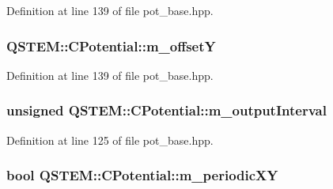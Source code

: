 Definition at line 139 of file pot\-\_\-base.\-hpp.

\hypertarget{class_q_s_t_e_m_1_1_c_potential_accee84f1b62c4d86ff92cea388737b4d}{
\subsubsection[{m\-\_\-offset\-Y}]{ Q\-S\-T\-E\-M\-::\-C\-Potential\-::m\-\_\-offset\-Y\hspace{0.3cm}{\ttfamily [protected]}}}\label{class_q_s_t_e_m_1_1_c_potential_accee84f1b62c4d86ff92cea388737b4d}


Definition at line 139 of file pot\-\_\-base.\-hpp.

\hypertarget{class_q_s_t_e_m_1_1_c_potential_af35e6474bd6357b24f88b29dd5a1a1d2}{
\subsubsection[{m\-\_\-output\-Interval}]{\setlength{\rightskip}{0pt plus 5cm}unsigned Q\-S\-T\-E\-M\-::\-C\-Potential\-::m\-\_\-output\-Interval\hspace{0.3cm}{\ttfamily [protected]}}}\label{class_q_s_t_e_m_1_1_c_potential_af35e6474bd6357b24f88b29dd5a1a1d2}


Definition at line 125 of file pot\-\_\-base.\-hpp.

\hypertarget{class_q_s_t_e_m_1_1_c_potential_af814821bdd0dfd339dac5c998cea9753}{
\subsubsection[{m\-\_\-periodic\-X\-Y}]{\setlength{\rightskip}{0pt plus 5cm}bool Q\-S\-T\-E\-M\-::\-C\-Potential\-::m\-\_\-periodic\-X\-Y\hspace{0.3cm}{\ttfamily [protected]}}}\label{class_q_s_t_e_m_1_1_c_potential_af814821bdd0dfd339dac5c998cea9753}


